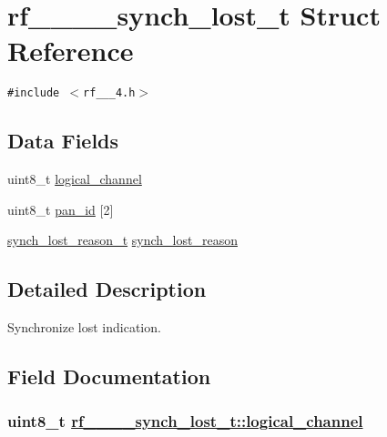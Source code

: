 \hypertarget{structrf__802__15__4__synch__lost__t}{
\section{rf\_\_\_\_\-synch\_\-lost\_\-t Struct Reference}
\label{structrf__802__15__4__synch__lost__t}
}
{\tt \#include $<$rf\_\_\_\-4.h$>$}

\subsection*{Data Fields}
\begin{CompactItemize}
\item 
uint8\_\-t \hyperlink{structrf__802__15__4__synch__lost__t_796cf20234d117b766d698b0ef4e6820}{logical\_\-channel}
\item 
uint8\_\-t \hyperlink{structrf__802__15__4__synch__lost__t_ed60608d32963aac8f9609578be68f8b}{pan\_\-id} \mbox{[}2\mbox{]}
\item 
\hyperlink{rf__802__15__4_8h_b7a607c44af208866c5d708fd7729b62}{synch\_\-lost\_\-reason\_\-t} \hyperlink{structrf__802__15__4__synch__lost__t_5ee82a6d8ff2eb566f6aa375d38ea1ff}{synch\_\-lost\_\-reason}
\end{CompactItemize}


\subsection{Detailed Description}
Synchronize lost indication. 



\subsection{Field Documentation}
\hypertarget{structrf__802__15__4__synch__lost__t_796cf20234d117b766d698b0ef4e6820}{
\subsubsection[logical\_\-channel]{\setlength{\rightskip}{0pt plus 5cm}uint8\_\-t \hyperlink{structrf__802__15__4__synch__lost__t_796cf20234d117b766d698b0ef4e6820}{rf\_\_\_\_\-synch\_\-lost\_\-t::logical\_\-channel}}}
\label{structrf__802__15__4__synch__lost__t_796cf20234d117b766d698b0ef4e6820}


